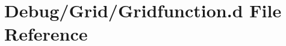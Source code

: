 \hypertarget{_debug_2_grid_2_gridfunction_8d}{\section{Debug/\-Grid/\-Gridfunction.d File Reference}
\label{d2/d65/_debug_2_grid_2_gridfunction_8d}
}
